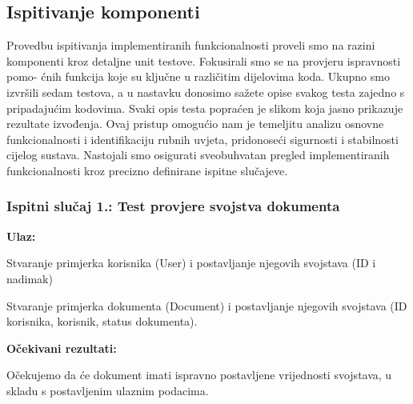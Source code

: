 			
			\subsection{Ispitivanje komponenti}

			 Provedbu ispitivanja implementiranih funkcionalnosti proveli smo na razini komponenti kroz detaljne unit testove. Fokusirali smo se na provjeru ispravnosti pomo- ćnih funkcija koje su ključne u različitim dijelovima koda. Ukupno smo izvršili sedam testova, a u nastavku donosimo sažete opise svakog testa zajedno s pripadajućim kodovima. Svaki opis testa popraćen je slikom koja jasno prikazuje rezultate izvođenja. Ovaj pristup omogućio nam je temeljitu analizu osnovne funkcionalnosti i identifikaciju rubnih uvjeta, pridonoseći sigurnosti i stabilnosti cijelog sustava. Nastojali smo osigurati sveobuhvatan pregled implementiranih funkcionalnosti kroz precizno definirane ispitne slučajeve.


            \subsubsection{Ispitni slučaj 1.: Test provjere svojstva dokumenta}

                        \noindent\textbf{Ulaz:}
                        \begin{packed_item}
                        	\item  Stvaranje primjerka korisnika (User) i postavljanje njegovih svojstava (ID i nadimak)
                        	\item  Stvaranje primjerka dokumenta (Document) i postavljanje njegovih svojstava (ID korisnika, korisnik, status dokumenta).
                        \end{packed_item}

                        \noindent\textbf{Očekivani rezultati:}
                        \begin{packed_item}
                        	\item  Očekujemo da će dokument imati ispravno postavljene vrijednosti svojstava, u skladu s postavljenim ulaznim podacima.
                        \end{packed_item}
                      
